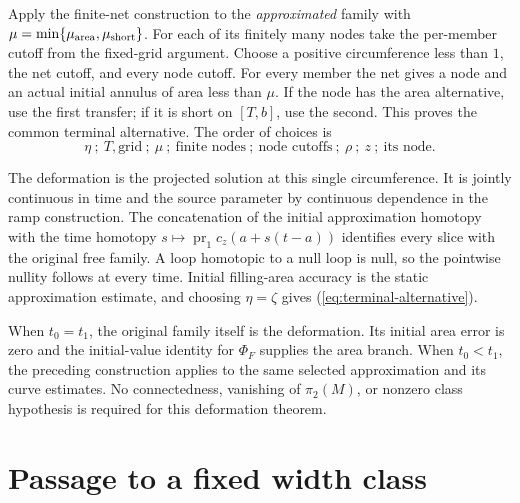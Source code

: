 \begin{lemma}\label{lem:annular-common-terminal}
Apply the finite-net construction to the \emph{approximated} family with
$\mu=\min\{\mu_{\rm area},\mu_{\rm short}\}$.
For each of its finitely many nodes take the per-member cutoff from the
fixed-grid argument.  Choose a positive circumference less than $1$, the
net cutoff, and every node cutoff.  For every member the net gives a node
and an actual initial annulus of area less than $\mu$.  If the node has
the area alternative, use the first transfer; if it is short on $[T,b]$,
use the second.  This proves the common terminal alternative.
The order of choices is
\[
 \eta\ ;\ T,\text{grid}\ ;\ \mu\ ;\ \text{finite nodes}\ ;\
 \text{node cutoffs}\ ;\ \rho\ ;\ z\ ;\ \text{its node}.
\]
\end{lemma}

The deformation is the projected solution at this single circumference.
It is jointly continuous in time and the source parameter by continuous
dependence in the ramp construction.  The concatenation of the initial
approximation homotopy with the time homotopy
$s\mapsto\operatorname{pr}_1c_z(a+s(t-a))$ identifies every slice with
the original free family.  A loop homotopic to a null loop is null, so the
pointwise nullity follows at every time.  Initial filling-area accuracy is
the static approximation estimate, and choosing $\eta=\zeta$ gives
(\ref{eq:terminal-alternative}).

When $t_0=t_1$, the original family itself is the deformation.  Its initial
area error is zero and the initial-value identity for $\Phi_F$ supplies the
area branch.  When $t_0<t_1$, the preceding construction applies to the same
selected approximation and its curve estimates.  No connectedness,
vanishing of $\pi_2(M)$, or nonzero class hypothesis is required for this
deformation theorem.

\section{Passage to a fixed width class}
\label{sec:annular-interfaces}

